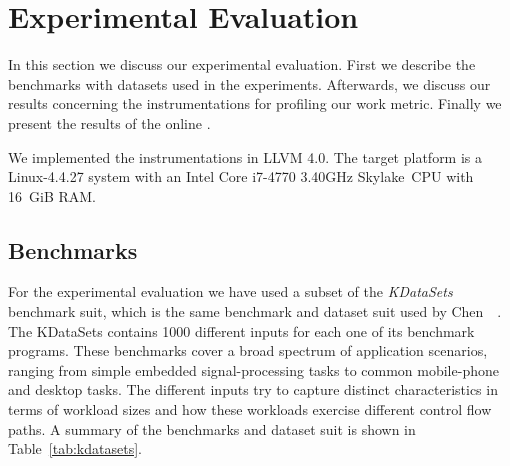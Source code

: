 
\chapter{Experimental Evaluation}

In this section we discuss our experimental evaluation.
First we describe the benchmarks with datasets used in the experiments.
Afterwards, we discuss our results concerning the instrumentations for profiling our work metric.
Finally we present the results of the online {\itercomp}.

We implemented the instrumentations in LLVM 4.0.
The target platform is a Linux-4.4.27 system with an Intel Core i7-4770 3.40GHz Skylake~CPU with 16~GiB RAM.

\section{Benchmarks}


For the experimental evaluation we have used a subset of the \textit{KDataSets} benchmark suit, which is the same benchmark and dataset suit used by Chen~\etal~\cite{chen10,chen12a}.
The KDataSets contains 1000 different inputs for each one of its benchmark programs.
These benchmarks cover a broad spectrum of application scenarios, ranging from simple embedded signal-processing tasks to common mobile-phone and desktop tasks.
The different inputs try to capture distinct characteristics in terms of workload sizes and how these workloads exercise different control flow paths.
A summary of the benchmarks and dataset suit is shown in Table~\ref{tab:kdatasets}.

